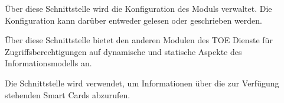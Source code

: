 




Über diese Schnittstelle wird die Konfiguration des Moduls
 verwaltet. Die Konfiguration kann darüber entweder
gelesen oder geschrieben werden.


Über diese Schnittstelle bietet  den anderen Modulen
des TOE Dienste für Zugriffsberechtigungen auf dynamische und
statische Aspekte des Informationsmodells an.


Die Schnittstelle  wird
verwendet, um Informationen über die zur Verfügung stehenden Smart
Cards abzurufen.


